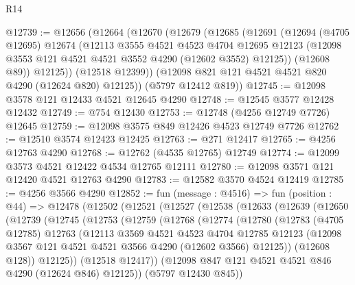 \begin{lexlean}{R14}
\begin{coremodule}
@12739 := @12656
    (@12664
      (@12670
        (@12679
          (@12685
            (@12691
              (@12694
                (@4705 @12695)
                @12674
                (@12113
                  @3555
                  @4521
                  @4523
                  @4704
                  @12695
                  @12123
                  (@12098 @3553 @121 @4521 @4521 @3552 @4290 (@12602 @3552) @12125))
                (@12608 @89))
              @12125))
          (@12518 @12399))
        (@12098 @821 @121 @4521 @4521 @820 @4290 (@12624 @820) @12125))
      (@5797 @12412 @819))
@12745 := @12098 @3578 @121 @12433 @4521 @12645 @4290
@12748 := @12545 @3577 @12428 @12432
@12749 := @754 @12430
@12753 := @12748 (@4256 @12749 @7726) @12645
@12759 := @12098 @3575 @849 @12426 @4523 @12749 @7726
@12762 := @12510 @3574 @12423 @12425
@12763 := @271 @12417
@12765 := @4256 @12763 @4290
@12768 := @12762 (@4535 @12765) @12749
@12774 := @12099 @3573 @4521 @12422 @4534 @12765 @12111
@12780 := @12098 @3571 @121 @12420 @4521 @12763 @4290
@12783 := @12582 @3570 @4524 @12419
@12785 := @4256 @3566 @4290
@12852 := fun (message : @4516) =>
  fun (position : @44) =>
  @12478
    (@12502
      (@12521
        (@12527
          (@12538
            (@12633
              (@12639
                (@12650
                  (@12739
                    (@12745
                      (@12753
                        (@12759
                          (@12768
                            (@12774
                              (@12780
                                (@12783
                                  (@4705 @12785)
                                  @12763
                                  (@12113
                                    @3569
                                    @4521
                                    @4523
                                    @4704
                                    @12785
                                    @12123
                                    (@12098
                                      @3567
                                      @121
                                      @4521
                                      @4521
                                      @3566
                                      @4290
                                      (@12602 @3566)
                                      @12125))
                                  (@12608 @128))
                                @12125))
                            (@12518 @12417))
                          (@12098 @847 @121 @4521 @4521 @846 @4290 (@12624 @846) @12125))
                        (@5797 @12430 @845))

\end{coremodule}
\end{lexlean}
